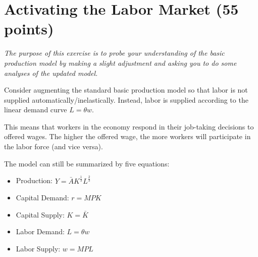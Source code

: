 \documentclass{article}
\begin{document}
\section*{Activating the Labor Market (55 points)}
\small{\textit{The purpose of this exercise is to probe your understanding of the basic production model by making a slight adjustment and asking you to do some analyses of the updated model.}}

Consider augmenting the standard basic production model so that labor is not supplied automatically/inelastically. Instead, labor is supplied according to the linear demand curve $L = \theta w$.

This means that workers in the economy respond in their job-taking decisions to offered wages. The higher the offered wage, the more workers will participate in the labor force (and vice versa).

The model can still be summarized by five equations:

\begin{itemize}
\item Production: $Y = \bar{A} K^\frac13 L^\frac23$
\item Capital Demand: $r = MPK$
\item Capital Supply: $K = \bar{K}$
\item Labor Demand: $L = \theta w$
\item Labor Supply: $w = MPL$
\end{itemize}
\end{document}
